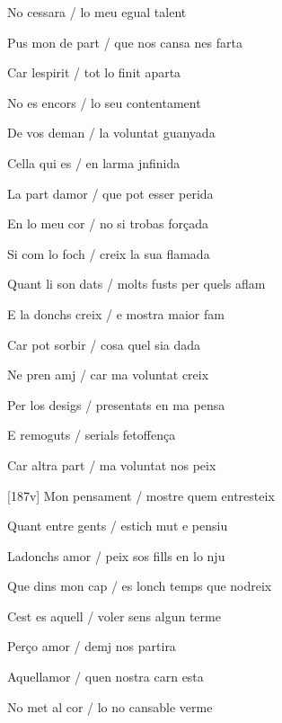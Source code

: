 \documentclass[12pt]{article}
\begin{document}
\begin{estrofa}

 No cessara / lo meu egual talent

 Pus mon de part / que nos cansa nes farta

 Car lespirit / tot lo finit aparta

 No es encors / lo seu contentament

 De vos deman / la voluntat guanyada

 Cella qui es / en larma jnfinida

 La part damor / que pot esser perida

 En lo meu cor / no si trobas for\c{c}ada

\end{estrofa}



\begin{estrofa}

 Si com lo foch / creix la sua flamada

 Quant li son dats / molts fusts per quels aflam

 E la donchs creix / e mostra maior fam

 Car pot sorbir / cosa quel sia dada

 Ne pren amj / car ma voluntat creix

 Per los desigs / presentats en ma pensa

 E remoguts / serials fetoffen\c{c}a

 Car altra part / ma voluntat nos peix

\end{estrofa}



\begin{estrofa}

 [187v] Mon pensament / mostre quem entresteix

 Quant entre gents / estich mut e pensiu

 Ladonchs amor / peix sos fills en lo nju

 Que dins mon cap / es lonch temps que nodreix

 Cest es aquell / voler sens algun terme

 Per\c{c}o amor / demj nos partira

 Aquellamor / quen nostra carn esta

 No met al cor / lo no cansable verme

\end{estrofa}
\end{document}
